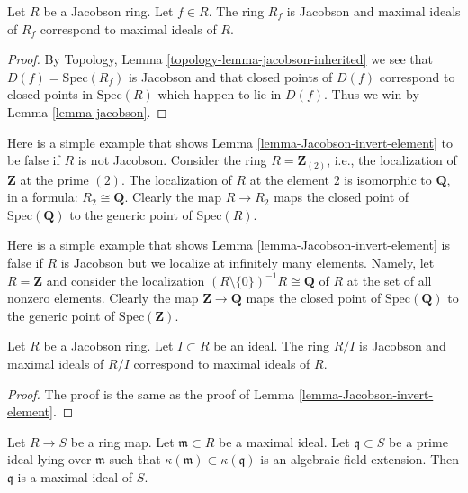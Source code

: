 \begin{lemma}
\label{lemma-Jacobson-invert-element}
Let $R$ be a Jacobson ring. Let $f \in R$.
The ring $R_f$ is Jacobson and maximal ideals
of $R_f$ correspond to maximal ideals of $R$.
\end{lemma}

\begin{proof}
By Topology, Lemma \ref{topology-lemma-jacobson-inherited}
we see that $D(f) = \text{Spec}(R_f)$ is Jacobson and
that closed points of $D(f)$
correspond to closed points in $\text{Spec}(R)$
which happen to lie in $D(f)$. Thus we win by
Lemma \ref{lemma-jacobson}.
\end{proof}

\begin{example}
\label{example-localize-not-preserve-closed-points}
Here is a simple example that shows Lemma \ref{lemma-Jacobson-invert-element}
to be false if $R$ is not Jacobson.
Consider the ring $R = \mathbf{Z}_{(2)}$, i.e., the localization
of $\mathbf{Z}$ at the prime $(2)$. The localization of $R$ at
the element $2$ is isomorphic to $\mathbf{Q}$, in a formula:
$R_2 \cong \mathbf{Q}$. Clearly the map $R \to R_2$ maps the
closed point of $\text{Spec}(\mathbf{Q})$ to the generic point
of $\text{Spec}(R)$.
\end{example}

\begin{example}
\label{example-infinite-localize-not-preserve-closed-points}
Here is a simple example that shows
Lemma \ref{lemma-Jacobson-invert-element}
is false if $R$ is Jacobson but we localize at infinitely
many elements.
Namely, let $R = \mathbf{Z}$ and consider the localization
$(R \setminus \{0\})^{-1}R \cong \mathbf{Q}$
of $R$ at the set of all nonzero elements.
Clearly the map $\mathbf{Z} \to \mathbf{Q}$ maps the
closed point of $\text{Spec}(\mathbf{Q})$ to the generic point
of $\text{Spec}(\mathbf{Z})$.
\end{example}

\begin{lemma}
\label{lemma-Jacobson-mod-ideal}
Let $R$ be a Jacobson ring. Let $I \subset R$ be an ideal.
The ring $R/I$ is Jacobson and maximal ideals
of $R/I$ correspond to maximal ideals of $R$.
\end{lemma}

\begin{proof}
The proof is the same as the proof of
Lemma \ref{lemma-Jacobson-invert-element}.
\end{proof}

\begin{lemma}
\label{lemma-finite-residue-extension-closed}
Let $R \to S$ be a ring map.
Let $\mathfrak m \subset R$ be a maximal ideal.
Let $\mathfrak q \subset S$ be a prime ideal
lying over $\mathfrak m$ such that $\kappa(\mathfrak m)
\subset \kappa(\mathfrak q)$ is an algebraic field extension.
Then $\mathfrak q$ is a maximal ideal of $S$.
\end{lemma}

